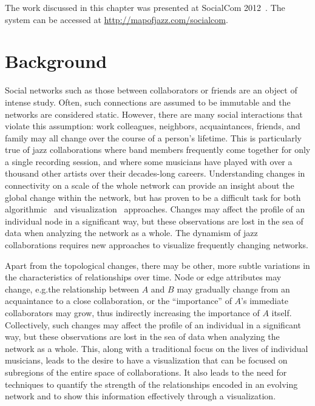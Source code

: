 \documentclass[12pt]{cmuthesis}
\begin{document}
The work discussed in this chapter was presented at SocialCom 2012~\cite{Filippova2012moj}. The system can be accessed at \url{http://mapofjazz.com/socialcom}.

\section{Background}

  Social networks such as those between collaborators or friends are an object of intense study. Often, such connections are assumed to be immutable and the networks are considered static. However, there are many social interactions that violate this assumption: work colleagues, neighbors, acquaintances, friends, and family may all change over the course of a person's lifetime. This is particularly true of jazz collaborations where band members frequently come together for only a single recording session, and where some musicians have played with over a thousand other artists over their decades-long careers. Understanding changes in connectivity on a scale of the whole network can provide an insight about the global change within the network, but has proven to be a difficult task for both algorithmic~\cite{Hopcroft2004, Palla2005c, Tantipathananandh2007, TangLiuZhna08} and visualization~\cite{BenderDeMoll2006, Rosvall2010,Yi2010} approaches. Changes may affect the profile of an individual node in a significant way, but these observations are lost in the sea of data when analyzing the network as a whole. The dynamism of jazz collaborations requires new approaches to visualize frequently changing networks.

  Apart from the topological changes, there may be other, more subtle variations in the characteristics of relationships over time.  Node or edge attributes may change, e.g.\@ the relationship between $A$ and $B$ may gradually change from an acquaintance to a close collaboration, or the ``importance'' of $A$'s immediate collaborators may grow, thus indirectly increasing the importance of $A$ itself.  Collectively, such changes may affect the profile of an individual in a significant way, but these observations are lost in the sea of data when analyzing the network as a whole. This, along with a traditional focus on the lives of individual musicians, leads to the desire to have a visualization that can be focused on subregions of the entire space of collaborations. It also leads to the need for techniques to quantify the strength of the relationships encoded in an evolving network and to show this information effectively through a visualization.
\end{document}
